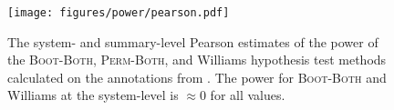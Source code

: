 \begin{figure}
    \centering
    \texttt{[image: figures/power/pearson.pdf]}
    \caption{The system- and summary-level Pearson estimates of the power of the \textsc{Boot-Both}, \textsc{Perm-Both}, and Williams hypothesis test methods calculated on the annotations from \citet{FKMSR21}.
    The power for \textsc{Boot-Both} and Williams at the system-level is $\approx 0$ for all values.}
    \label{fig:power}
\end{figure}